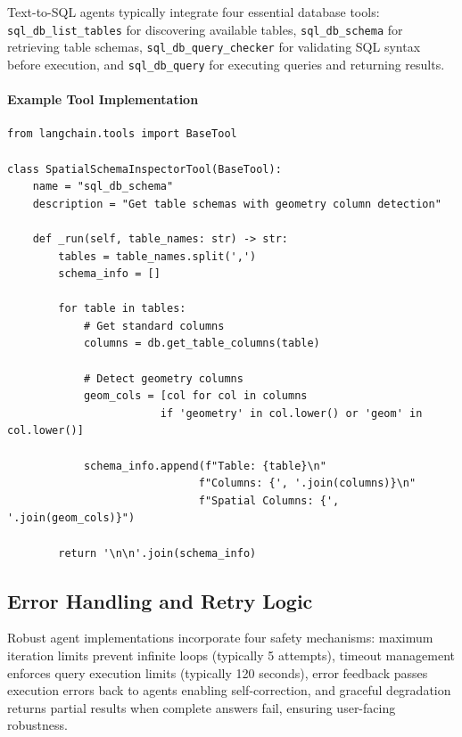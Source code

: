 Text-to-SQL agents typically integrate four essential database tools: \texttt{sql\_db\_list\_tables} for discovering available tables, \texttt{sql\_db\_schema} for retrieving table schemas, \texttt{sql\_db\_query\_checker} for validating SQL syntax before execution, and \texttt{sql\_db\_query} for executing queries and returning results.

\paragraph{Example Tool Implementation}

\begin{lstlisting}[style=pythonstyle, caption=Database schema tool with spatial awareness]
from langchain.tools import BaseTool

class SpatialSchemaInspectorTool(BaseTool):
    name = "sql_db_schema"
    description = "Get table schemas with geometry column detection"
    
    def _run(self, table_names: str) -> str:
        tables = table_names.split(',')
        schema_info = []
        
        for table in tables:
            # Get standard columns
            columns = db.get_table_columns(table)
            
            # Detect geometry columns
            geom_cols = [col for col in columns 
                        if 'geometry' in col.lower() or 'geom' in col.lower()]
            
            schema_info.append(f"Table: {table}\n"
                              f"Columns: {', '.join(columns)}\n"
                              f"Spatial Columns: {', '.join(geom_cols)}")
        
        return '\n\n'.join(schema_info)
\end{lstlisting}

\subsection{Error Handling and Retry Logic}

Robust agent implementations incorporate four safety mechanisms: maximum iteration limits prevent infinite loops (typically 5 attempts), timeout management enforces query execution limits (typically 120 seconds), error feedback passes execution errors back to agents enabling self-correction, and graceful degradation returns partial results when complete answers fail, ensuring user-facing robustness.


